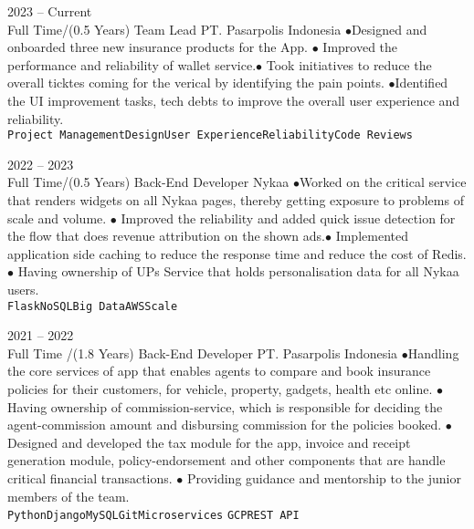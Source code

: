 \documentclass[9pt]{developercv} %
\begin{document}

\begin{entrylist}
	
	\entry
	{2023 -- Current\\\footnotesize{Full Time/(0.5 Years)}}
	{Team Lead}
	{PT. Pasarpolis Indonesia}
	{$\bullet$Designed and onboarded three new insurance products for the App. $\bullet$ Improved the performance and reliability of wallet service.$\bullet$ Took initiatives to reduce the overall ticktes coming for the verical by identifying the pain points. $\bullet$Identified the UI improvement tasks, tech debts to improve the overall user experience and reliability.\\ \texttt{Project Management}\slashsep\texttt{Design}\slashsep\texttt{User Experience}\slashsep\texttt{Reliability}\slashsep\texttt{Code Reviews}}

		\entry
	{2022 -- 2023\\\footnotesize{Full Time/(0.5 Years)}}
	{Back-End Developer}
	{Nykaa}
	{$\bullet$Worked on the critical service that renders widgets on all Nykaa pages, thereby getting exposure to problems of scale and volume. $\bullet$ Improved the reliability and added quick issue detection for the flow that does revenue attribution on the shown ads.$\bullet$ Implemented application side caching to reduce the response time and reduce the cost of Redis.$\bullet$ Having ownership of UPs Service that holds personalisation data for all Nykaa users.\\ \texttt{Flask}\slashsep\texttt{NoSQL}\slashsep\texttt{Big Data}\slashsep\texttt{AWS}\slashsep\texttt{Scale}}

		\entry
	{2021 -- 2022\\\footnotesize{Full Time /(1.8 Years)}}
	{Back-End Developer}
	{PT. Pasarpolis Indonesia}
	{$\bullet$Handling the core services of app that enables agents to compare and book insurance policies for their customers, for vehicle, property, gadgets, health  etc online. $\bullet$ Having ownership of commission-service, which is responsible for deciding the agent-commission amount and disbursing commission for the policies booked. $\bullet$ Designed and developed the tax module for the app, invoice and receipt generation module, policy-endorsement and other components that are handle critical financial transactions. $\bullet$ Providing guidance and mentorship to the junior members of the team.\\ \texttt{Python}\slashsep\texttt{Django}\slashsep\texttt{MySQL}\slashsep\texttt{Git}\slashsep\texttt{Microservices} \slashsep\texttt{GCP}\slashsep\texttt{REST API}}
	

\end{entrylist}
\end{document}
